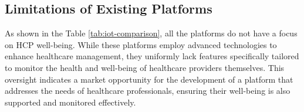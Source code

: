 \subsection{Limitations of Existing Platforms}
As shown in the Table \ref{tab:iot-comparison}, all the platforms do not have a focus on HCP well-being. While these platforms employ advanced technologies to enhance healthcare management, they uniformly lack features specifically tailored to monitor the health and well-being of healthcare providers themselves. This oversight indicates a market opportunity for the development of a platform that addresses the needs of healthcare professionals, ensuring their well-being is also supported and monitored effectively.